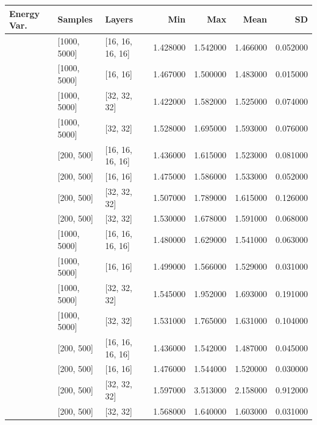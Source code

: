 \begin{tabular}{lllrrrr}
\toprule
Energy Var. & Samples & Layers & Min & Max & Mean & SD \\
\midrule
[0.001, 0.0001] & [1000, 5000] & [16, 16, 16, 16] & 1.428000 & 1.542000 & 1.466000 & 0.052000 \\
[0.001, 0.0001] & [1000, 5000] & [16, 16] & 1.467000 & 1.500000 & 1.483000 & 0.015000 \\
[0.001, 0.0001] & [1000, 5000] & [32, 32, 32] & 1.422000 & 1.582000 & 1.525000 & 0.074000 \\
[0.001, 0.0001] & [1000, 5000] & [32, 32] & 1.528000 & 1.695000 & 1.593000 & 0.076000 \\
[0.001, 0.0001] & [200, 500] & [16, 16, 16, 16] & 1.436000 & 1.615000 & 1.523000 & 0.081000 \\
[0.001, 0.0001] & [200, 500] & [16, 16] & 1.475000 & 1.586000 & 1.533000 & 0.052000 \\
[0.001, 0.0001] & [200, 500] & [32, 32, 32] & 1.507000 & 1.789000 & 1.615000 & 0.126000 \\
[0.001, 0.0001] & [200, 500] & [32, 32] & 1.530000 & 1.678000 & 1.591000 & 0.068000 \\
[0.1, 0.01] & [1000, 5000] & [16, 16, 16, 16] & 1.480000 & 1.629000 & 1.541000 & 0.063000 \\
[0.1, 0.01] & [1000, 5000] & [16, 16] & 1.499000 & 1.566000 & 1.529000 & 0.031000 \\
[0.1, 0.01] & [1000, 5000] & [32, 32, 32] & 1.545000 & 1.952000 & 1.693000 & 0.191000 \\
[0.1, 0.01] & [1000, 5000] & [32, 32] & 1.531000 & 1.765000 & 1.631000 & 0.104000 \\
[0.1, 0.01] & [200, 500] & [16, 16, 16, 16] & 1.436000 & 1.542000 & 1.487000 & 0.045000 \\
[0.1, 0.01] & [200, 500] & [16, 16] & 1.476000 & 1.544000 & 1.520000 & 0.030000 \\
[0.1, 0.01] & [200, 500] & [32, 32, 32] & 1.597000 & 3.513000 & 2.158000 & 0.912000 \\
[0.1, 0.01] & [200, 500] & [32, 32] & 1.568000 & 1.640000 & 1.603000 & 0.031000 \\
\bottomrule
\end{tabular}
